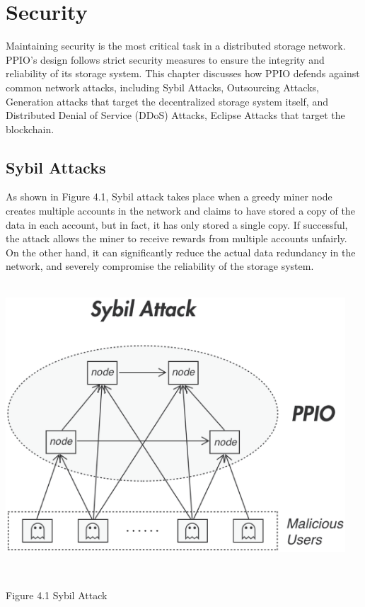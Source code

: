 \documentclass[10pt,a4paper]{article}
\begin{document}
   \section{Security} %
Maintaining security is the most critical task in a distributed storage network. PPIO’s design follows strict security measures to ensure the integrity and reliability of its storage system. This chapter discusses how PPIO defends against common network attacks, including Sybil Attacks, Outsourcing Attacks, Generation attacks that target the decentralized storage system itself, and Distributed Denial of Service (DDoS) Attacks, Eclipse Attacks that target the blockchain.
   \vspace{-0.5em}
      \subsection{Sybil Attacks} %
As shown in Figure 4.1, Sybil attack takes place when a greedy miner node creates multiple accounts in the network and claims to have stored a copy of the data in each account, but in fact, it has only stored a single copy. If successful, the attack allows the miner to receive rewards from multiple accounts unfairly. On the other hand, it can significantly reduce the actual data redundancy in the network, and severely compromise the reliability of the storage system.
\\\\ \centerline{\includegraphics[width=360pt]{fig15}}
\\ \centerline{{Figure 4.1 Sybil Attack}}
   \vspace{-1.5em}
\\
\end{document}
